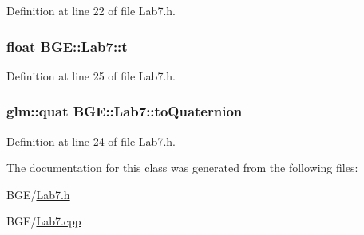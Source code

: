Definition at line 22 of file Lab7.\-h.

\hypertarget{class_b_g_e_1_1_lab7_adff10790b0f22dfbf447417c131b6de8}{
\subsubsection[{t}]{\setlength{\rightskip}{0pt plus 5cm}float B\-G\-E\-::\-Lab7\-::t}}\label{class_b_g_e_1_1_lab7_adff10790b0f22dfbf447417c131b6de8}


Definition at line 25 of file Lab7.\-h.

\hypertarget{class_b_g_e_1_1_lab7_a70afa9a9116b7657373106f3b8e03527}{
\subsubsection[{to\-Quaternion}]{\setlength{\rightskip}{0pt plus 5cm}glm\-::quat B\-G\-E\-::\-Lab7\-::to\-Quaternion}}\label{class_b_g_e_1_1_lab7_a70afa9a9116b7657373106f3b8e03527}


Definition at line 24 of file Lab7.\-h.



The documentation for this class was generated from the following files\-:\begin{DoxyCompactItemize}
\item 
B\-G\-E/\hyperlink{_lab7_8h}{Lab7.\-h}\item 
B\-G\-E/\hyperlink{_lab7_8cpp}{Lab7.\-cpp}\end{DoxyCompactItemize}

